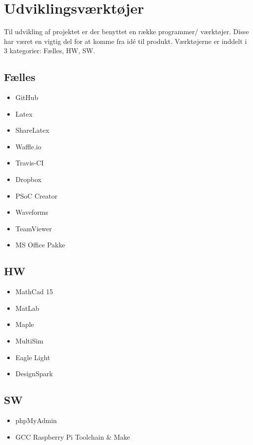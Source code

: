 \section{Udviklingsværktøjer}
Til udvikling af projektet er der benyttet en række programmer/ værktøjer. 
Disse har været en vigtig del for at komme fra idé til produkt. 
Værktøjerne er inddelt i 3 kategorier: Fælles, HW, SW.

\subsection{Fælles}
\begin{itemize}
\item GitHub
\item Latex
\item ShareLatex
\item Waffle.io
\item Travis-CI
\item Dropbox
\item PSoC Creator
\item Waveforms
\item TeamViewer
\item MS Office Pakke
\end{itemize}

\subsection{HW}
\begin{itemize}
\item MathCad 15
\item MatLab
\item Maple
\item MultiSim
\item Eagle Light
\item DesignSpark
\end{itemize}

\subsection{SW} 
\begin{itemize}
\item phpMyAdmin
\item GCC Raspberry Pi Toolchain & Make
\end{itemize}